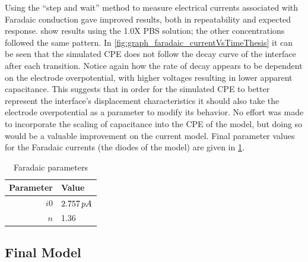         Using the ``step and wait'' method to measure electrical currents associated with Faradaic conduction gave improved results, both in repeatability and expected response.
         show results using the 1.0X PBS solution; the other concentrations followed the same pattern.
        In \cref{fig:graph_faradaic_currentVsTimeThesis} it can be seen that the simulated CPE does not follow the decay curve of the interface after each transition.
        Notice again how the rate of decay appears to be dependent on the electrode overpotential, with higher voltages resulting in lower apparent capacitance.
        This suggests that in order for the simulated CPE to better represent the interface's displacement characteristics it should also take the electrode overpotential as a parameter to modify its behavior.
        No effort was made to incorporate the scaling of capacitance into the CPE of the model, but doing so would be a valuable improvement on the current model.
        Final parameter values for the Faradaic currents (the diodes of the model) are given in \cref{tab:FaradaicParams}.

        \begin{table}
          \caption{Faradaic parameters}
          \label{tab:FaradaicParams}
          \begin{center}
            \begin{tabular}{r | l}
                Parameter & Value \\
                \hline
                $i0$ & $2.757\thinspace pA$\\
                $n$ & 1.36\\
            \end{tabular}
          \end{center}
        \end{table}






    \subsection{Final Model}

